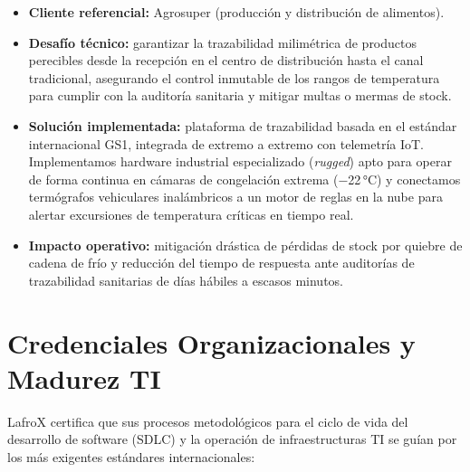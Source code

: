 \begin{itemize}
  \item \textbf{Cliente referencial:} Agrosuper (producción y distribución de alimentos).
  \item \textbf{Desafío técnico:} garantizar la trazabilidad milimétrica de productos
        perecibles desde la recepción en el centro de distribución hasta el canal
        tradicional, asegurando el control inmutable de los rangos de temperatura para
        cumplir con la auditoría sanitaria y mitigar multas o mermas de stock.
  \item \textbf{Solución implementada:} plataforma de trazabilidad basada en el estándar
        internacional GS1, integrada de extremo a extremo con telemetría IoT.
        Implementamos hardware industrial especializado (\emph{rugged}) apto para operar
        de forma continua en cámaras de congelación extrema ($-$22\,°C) y conectamos
        termógrafos vehiculares inalámbricos a un motor de reglas en la nube para alertar
        excursiones de temperatura críticas en tiempo real.
  \item \textbf{Impacto operativo:} mitigación drástica de pérdidas de stock por quiebre
        de cadena de frío y reducción del tiempo de respuesta ante auditorías de
        trazabilidad sanitarias de días hábiles a escasos minutos.
\end{itemize}

\section{Credenciales Organizacionales y Madurez TI}

LafroX certifica que sus procesos metodológicos para el ciclo de vida del desarrollo de
software (SDLC) y la operación de infraestructuras TI se guían por los más exigentes
estándares internacionales:

